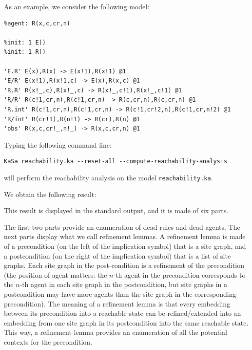 \documentclass[11pt]{book}
\begin{document}
As an example, we consider the following model:
\begin{lstlisting}[language=kappa]
%agent: E(x)
%agent: R(x,c,cr,n)

%init: 1 E()
%init: 1 R()

'E.R' E(x),R(x) -> E(x!1),R(x!1) @1
'E/R' E(x!1),R(x!1,c) -> E(x),R(x,c) @1
'R.R' R(x!_,c),R(x!_,c) -> R(x!_,c!1),R(x!_,c!1) @1
'R/R' R(c!1,cr,n),R(c!1,cr,n) -> R(c,cr,n),R(c,cr,n) @1
'R.int' R(c!1,cr,n),R(c!1,cr,n) -> R(c!1,cr!2,n),R(c!1,cr,n!2) @1
'R/int' R(cr!1),R(n!1) -> R(cr),R(n) @1
'obs' R(x,c,cr!_,n!_) -> R(x,c,cr,n) @1
\end{lstlisting}

Typing the following command line:
\begin{verbatim}
KaSa reachability.ka --reset-all --compute-reachability-analysis
\end{verbatim}

will perform the reachability analysis on the model \texttt{reachability.ka}.

We obtain the following result:




This result is displayed in the standard output, and it is made of six parts.

The first two parts provide an enumeration of dead rules and dead agents.
The next parts display what we call refinement lemmas.
A refinement lemma is made of a precondition (on the left of the implication symbol) that is a site graph, and a postcondition (on the right of the implication symbol) that is a list of site graphs. Each site graph in the post-condition is a refinement of the precondition (the position of agent matters: the $n$-th agent in the precondition corresponds to the $n$-th agent in each site graph in the postcondition, but site graphs in a postcondition may have more agents than the site graph in the corresponding precondition).
The meaning of a refinement lemma is that every embedding between its precondition into a reachable state can be refined/extended into
an embedding from one site graph in its postcondition into the same reachable state. This way, a refinement lemma provides an enumeration of all the potential contexts for the precondition.
\end{document}
